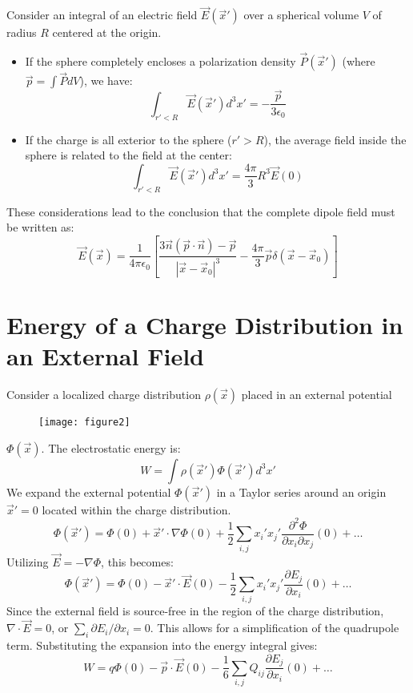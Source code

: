 \documentclass{article}
\begin{document}
	Consider an integral of an electric field $\vec{E}(\vec{x}')$ over a spherical volume $V$ of radius $R$ centered at the origin.
	\begin{itemize}
		\item If the sphere completely encloses a polarization density $\vec{P}(\vec{x}')$ (where $\vec{p} = \int \vec{P} dV$), we have:
		\[
		\int_{r'<R} \vec{E}(\vec{x}') d^3x' = -\frac{\vec{p}}{3\epsilon_0}
		\]
		\item If the charge is all exterior to the sphere ($r' > R$), the average field inside the sphere is related to the field at the center:
		\[
		\int_{r'<R} \vec{E}(\vec{x}') d^3x' = \frac{4\pi}{3} R^3 \vec{E}(0)
		\]
	\end{itemize}
	These considerations lead to the conclusion that the complete dipole field must be written as:
	\[
	\vec{E}(\vec{x}) = \frac{1}{4\pi\epsilon_0} \left[ \frac{3\vec{n}(\vec{p}\cdot\vec{n}) - \vec{p}}{|\vec{x}-\vec{x}_0|^3} - \frac{4\pi}{3}\vec{p}\delta(\vec{x}-\vec{x}_0) \right]
	\]
	
	\section{Energy of a Charge Distribution in an External Field}
	Consider a localized charge distribution $\rho(\vec{x})$ placed in an external potential
	
	\begin{figure}[h]
		\centering
		\texttt{[image: figure2]}
		\caption{}
		\label{fig:figure2}
	\end{figure}
	
	$\Phi(\vec{x})$. The electrostatic energy is:
	\[
	W = \int \rho(\vec{x}') \Phi(\vec{x}') d^3x'
	\]
	We expand the external potential $\Phi(\vec{x}')$ in a Taylor series around an origin $\vec{x}'=0$ located within the charge distribution.
	\[
	\Phi(\vec{x}') = \Phi(0) + \vec{x}' \cdot \nabla\Phi(0) + \frac{1}{2}\sum_{i,j} x_i' x_j' \frac{\partial^2 \Phi}{\partial x_i \partial x_j}(0) + \dots
	\]
	Utilizing $\vec{E} = -\nabla\Phi$, this becomes:
	\[
	\Phi(\vec{x}') = \Phi(0) - \vec{x}' \cdot \vec{E}(0) - \frac{1}{2}\sum_{i,j} x_i' x_j' \frac{\partial E_j}{\partial x_i}(0) + \dots
	\]
	Since the external field is source-free in the region of the charge distribution, $\nabla \cdot \vec{E} = 0$, or $\sum_i \partial E_i / \partial x_i = 0$. This allows for a simplification of the quadrupole term. Substituting the expansion into the energy integral gives:
	\[
	W = q\Phi(0) - \vec{p}\cdot\vec{E}(0) - \frac{1}{6}\sum_{i,j} Q_{ij} \frac{\partial E_j}{\partial x_i}(0) + \dots
	\]
	
\end{document}
